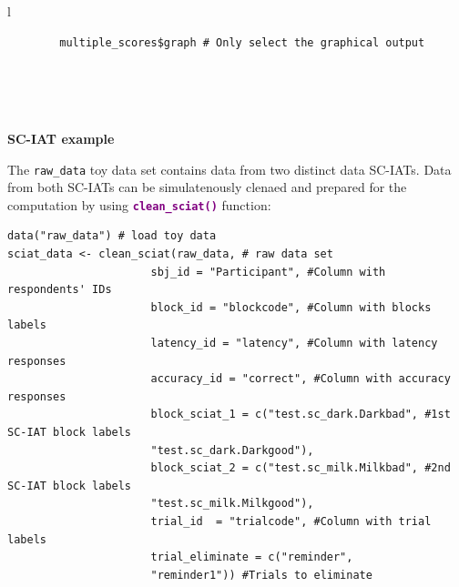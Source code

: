 \documentclass[a0,landscape]{a0poster}
\begin{document}
\begin{multicols*}{3}
		\vspace{.4cm}
	\begin{tabular}{l}
		\begin{lstlisting}
		multiple_scores$graph # Only select the graphical output
		\end{lstlisting}\\
		\\
		  \\
	\end{tabular}


 
\vfill\null
\columnbreak

\begin{center}
	\huge \textbf{\textcolor{title}{SC-IAT example}}
\end{center}

The \texttt{raw\_data} toy data set contains data from two distinct data SC-IATs. Data from both SC-IATs can be simulatenously clenaed and prepared for the computation by using \textbf{\textcolor{purple}{\texttt{clean\_sciat()}}} function: 
\begin{lstlisting}
data("raw_data") # load toy data 
sciat_data <- clean_sciat(raw_data, # raw data set
                      sbj_id = "Participant", #Column with respondents' IDs
                      block_id = "blockcode", #Column with blocks labels
                      latency_id = "latency", #Column with latency responses
                      accuracy_id = "correct", #Column with accuracy responses
                      block_sciat_1 = c("test.sc_dark.Darkbad", #1st SC-IAT block labels
                      "test.sc_dark.Darkgood"),
                      block_sciat_2 = c("test.sc_milk.Milkbad", #2nd SC-IAT block labels
                      "test.sc_milk.Milkgood"),
                      trial_id  = "trialcode", #Column with trial labels
                      trial_eliminate = c("reminder", 
                      "reminder1")) #Trials to eliminate
\end{lstlisting}	


\end{multicols*}
\end{document}
